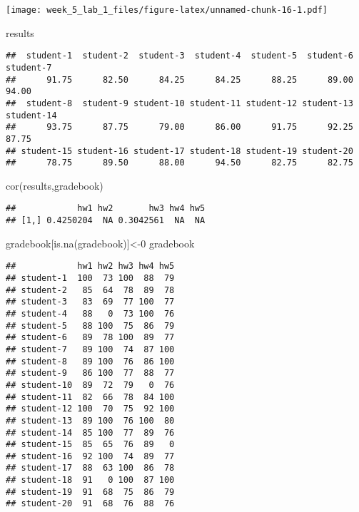 \documentclass[
]{article}
\newenvironment{Shaded}{\begin{snugshade}}{\end{snugshade}}
\newcommand{\DecValTok}[1]{\textcolor[rgb]{0.00,0.00,0.81}{#1}}
\newcommand{\FunctionTok}[1]{\textcolor[rgb]{0.00,0.00,0.00}{#1}}
\newcommand{\NormalTok}[1]{#1}
\newcommand{\OtherTok}[1]{\textcolor[rgb]{0.56,0.35,0.01}{#1}}
\begin{document}
\texttt{[image: week\_5\_lab\_1\_files/figure-latex/unnamed-chunk-16-1.pdf]}

\begin{Shaded}
\begin{Highlighting}[]
\NormalTok{results}
\end{Highlighting}
\end{Shaded}

\begin{verbatim}
##  student-1  student-2  student-3  student-4  student-5  student-6  student-7 
##      91.75      82.50      84.25      84.25      88.25      89.00      94.00 
##  student-8  student-9 student-10 student-11 student-12 student-13 student-14 
##      93.75      87.75      79.00      86.00      91.75      92.25      87.75 
## student-15 student-16 student-17 student-18 student-19 student-20 
##      78.75      89.50      88.00      94.50      82.75      82.75
\end{verbatim}

\begin{Shaded}
\begin{Highlighting}[]
\FunctionTok{cor}\NormalTok{(results,gradebook)}
\end{Highlighting}
\end{Shaded}

\begin{verbatim}
##            hw1 hw2       hw3 hw4 hw5
## [1,] 0.4250204  NA 0.3042561  NA  NA
\end{verbatim}

\begin{Shaded}
\begin{Highlighting}[]
\NormalTok{gradebook[}\FunctionTok{is.na}\NormalTok{(gradebook)]}\OtherTok{\textless{}{-}}\DecValTok{0}
\NormalTok{gradebook}
\end{Highlighting}
\end{Shaded}

\begin{verbatim}
##            hw1 hw2 hw3 hw4 hw5
## student-1  100  73 100  88  79
## student-2   85  64  78  89  78
## student-3   83  69  77 100  77
## student-4   88   0  73 100  76
## student-5   88 100  75  86  79
## student-6   89  78 100  89  77
## student-7   89 100  74  87 100
## student-8   89 100  76  86 100
## student-9   86 100  77  88  77
## student-10  89  72  79   0  76
## student-11  82  66  78  84 100
## student-12 100  70  75  92 100
## student-13  89 100  76 100  80
## student-14  85 100  77  89  76
## student-15  85  65  76  89   0
## student-16  92 100  74  89  77
## student-17  88  63 100  86  78
## student-18  91   0 100  87 100
## student-19  91  68  75  86  79
## student-20  91  68  76  88  76
\end{verbatim}
\end{document}
